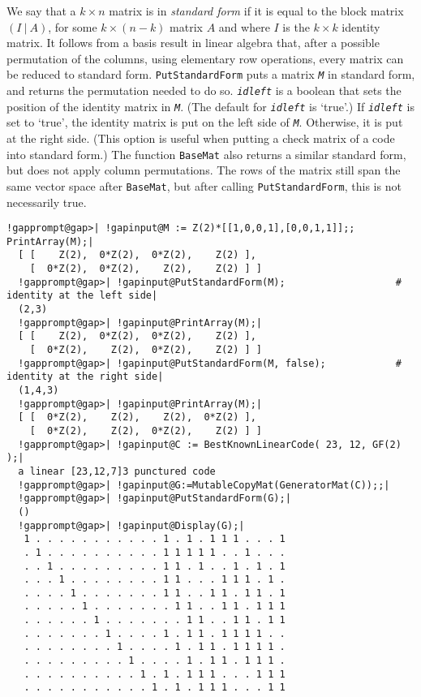 \documentclass[a4paper,11pt]{report}
\begin{document}
{{{ We say that a $k\times n$ matrix is in \emph{standard form} if it is equal to the block matrix $(I\ |\ A)$, for some $k\times (n-k)$ matrix $A$ and where $I$ is the $k\times k$ identity matrix. It follows from a basis result in linear algebra that, after
a possible permutation of the columns, using elementary row operations, every
matrix can be reduced to standard form. \texttt{PutStandardForm} puts a matrix \mbox{\texttt{\mdseries\slshape M}} in standard form, and returns the permutation needed to do so. \mbox{\texttt{\mdseries\slshape idleft}} is a boolean that sets the position of the identity matrix in \mbox{\texttt{\mdseries\slshape M}}. (The default for \mbox{\texttt{\mdseries\slshape idleft}} is `true'.) If \mbox{\texttt{\mdseries\slshape idleft}} is set to `true', the identity matrix is put on the left side of \mbox{\texttt{\mdseries\slshape M}}. Otherwise, it is put at the right side. (This option is useful when putting
a check matrix of a code into standard form.) The function \texttt{BaseMat} also returns a similar standard form, but does not apply column permutations.
The rows of the matrix still span the same vector space after \texttt{BaseMat}, but after calling \texttt{PutStandardForm}, this is not necessarily true. }

 
\begin{Verbatim}[commandchars=!@|,fontsize=\small,frame=single,label=Example]
  !gapprompt@gap>| !gapinput@M := Z(2)*[[1,0,0,1],[0,0,1,1]];; PrintArray(M);|
  [ [    Z(2),  0*Z(2),  0*Z(2),    Z(2) ],
    [  0*Z(2),  0*Z(2),    Z(2),    Z(2) ] ]
  !gapprompt@gap>| !gapinput@PutStandardForm(M);                   # identity at the left side|
  (2,3)
  !gapprompt@gap>| !gapinput@PrintArray(M);|
  [ [    Z(2),  0*Z(2),  0*Z(2),    Z(2) ],
    [  0*Z(2),    Z(2),  0*Z(2),    Z(2) ] ]
  !gapprompt@gap>| !gapinput@PutStandardForm(M, false);            # identity at the right side|
  (1,4,3)
  !gapprompt@gap>| !gapinput@PrintArray(M);|
  [ [  0*Z(2),    Z(2),    Z(2),  0*Z(2) ],
    [  0*Z(2),    Z(2),  0*Z(2),    Z(2) ] ]
  !gapprompt@gap>| !gapinput@C := BestKnownLinearCode( 23, 12, GF(2) );|
  a linear [23,12,7]3 punctured code
  !gapprompt@gap>| !gapinput@G:=MutableCopyMat(GeneratorMat(C));;|
  !gapprompt@gap>| !gapinput@PutStandardForm(G);|
  ()
  !gapprompt@gap>| !gapinput@Display(G);|
   1 . . . . . . . . . . . 1 . 1 . 1 1 1 . . . 1
   . 1 . . . . . . . . . . 1 1 1 1 1 . . 1 . . .
   . . 1 . . . . . . . . . 1 1 . 1 . . 1 . 1 . 1
   . . . 1 . . . . . . . . 1 1 . . . 1 1 1 . 1 .
   . . . . 1 . . . . . . . 1 1 . . 1 1 . 1 1 . 1
   . . . . . 1 . . . . . . . 1 1 . . 1 1 . 1 1 1
   . . . . . . 1 . . . . . . . 1 1 . . 1 1 . 1 1
   . . . . . . . 1 . . . . 1 . 1 1 . 1 1 1 1 . .
   . . . . . . . . 1 . . . . 1 . 1 1 . 1 1 1 1 .
   . . . . . . . . . 1 . . . . 1 . 1 1 . 1 1 1 .
   . . . . . . . . . . 1 . 1 . 1 1 1 . . . 1 1 1
   . . . . . . . . . . . 1 . 1 . 1 1 1 . . . 1 1
  

\end{Verbatim}}}
\end{document}
